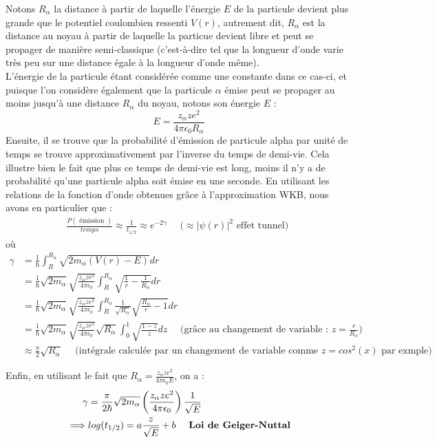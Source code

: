\documentclass{book}
\begin{document}
Notons $R_{\alpha}$ la distance à partir de laquelle l'énergie $E$ de la particule devient plus grande que le potentiel coulombien ressenti $V(r)$, autrement dit, $R_{\alpha}$ est la distance au noyau à partir de laquelle la particue devient libre et peut se propager de manière semi-classique (c'est-à-dire tel que la longueur d'onde varie très peu sur une distance égale à la longueur d'onde même). \\
L'énergie de la particule étant considérée comme une constante dans ce cas-ci, et puisque l'on considère également que la particule $\alpha$ émise peut se propager au moins jusqu'à une distance $R_{\alpha}$ du noyau, notons son énergie $E$ : $$ E= \frac{z_{\alpha}z e^2}{4 \pi \epsilon_0 R_{\alpha}}$$ 
Ensuite, il se trouve que la probabilité d'émission de particule alpha par unité de temps se trouve approximativement par l'inverse du temps de demi-vie. Cela illustre bien le fait que plus ce temps de demi-vie est long, moins il n'y a de probabilité qu'une particule alpha soit émise en une seconde. En utilisant les relations de la fonction d'onde obtenues grâce à l'approximation WKB,
nous avons en particulier que : 
\begin{align}
  \frac{P( \mbox{ émission } )}{temps} \approx \frac{1}{t_{1/2}} \approx e^{-2 \gamma} \quad \mbox{ ($\approx \lvert \psi (r) \rvert ^2$ effet tunnel) } 
\end{align}
où  \begin{align*}
  \gamma &= \frac{1}{\hbar} \int_R^{R_{\alpha}} \sqrt{2 m_{\alpha} (V(r) - E)} dr \\
  &= \frac{1}{\hbar} \sqrt{2 m_{\alpha}} \sqrt{\frac{z_{\alpha} z e^2}{4 \pi \epsilon_0}} \int_R^{R_{\alpha}} \sqrt{\frac{1}{r} - \frac{1}{R_{\alpha}}} dr \\
  &= \frac{1}{\hbar} \sqrt{2 m_{\alpha}} \sqrt{\frac{z_{\alpha} z e^2}{4 \pi \epsilon_0}} \int_R^{R_{\alpha}} \frac{1}{\sqrt{R_{\alpha}}} \sqrt{\frac{R_{\alpha}}{r} - 1} dr \\
  &= \frac{1}{\hbar} \sqrt{2 m_{\alpha}} \sqrt{\frac{z_{\alpha} z e^2}{4 \pi \epsilon_0}} \sqrt{R_{\alpha}} \int_0^1 \sqrt{\frac{1-z}{z}} dz \quad \mbox{ (grâce au changement de variable : $z = \frac{r}{R_{\alpha}}$)} \\
  &\approx \frac{\pi}{2} \sqrt{R_{\alpha}} \quad \mbox{ (intégrale calculée par un changement de variable comme $z = cos^2(x)$ par exmple)} 
\end{align*}

Enfin, en utilisant le fait que $R_{\alpha} = \frac{z_{\alpha} z e^2}{4 \pi \epsilon_0 E}$, on a :
\begin{align}
\label{Loi de Geiger-Nuttal}
  \gamma &= \frac{\pi}{2 \hbar} \sqrt{2 m_{\alpha}} \left( \frac{z_{\alpha} z e^2}{4 \pi \epsilon_0} \right) \frac{1}{\sqrt{E}} \notag \\
  \implies & log(t_{1/2}) = a \frac{z}{\sqrt{E}} + b \quad \mbox{ \textbf{Loi de Geiger-Nuttal}} 
\end{align}
\end{document}

